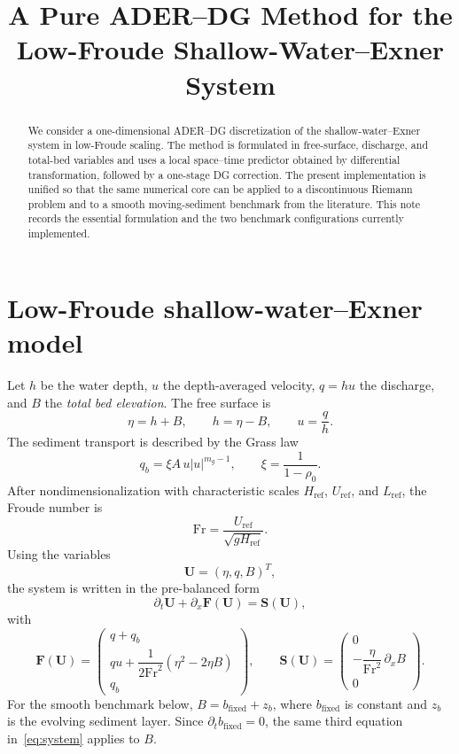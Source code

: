 \documentclass[11pt]{article}
\title{A Pure ADER--DG Method for the Low-Froude Shallow-Water--Exner System}
\author{}
\date{}
\newcommand{\Fr}{\mathrm{Fr}}
\begin{document}
\maketitle

\begin{abstract}
We consider a one-dimensional ADER--DG discretization of the shallow-water--Exner system in low-Froude scaling. The method is formulated in free-surface, discharge, and total-bed variables and uses a local space--time predictor obtained by differential transformation, followed by a one-stage DG correction. The present implementation is unified so that the same numerical core can be applied to a discontinuous Riemann problem and to a smooth moving-sediment benchmark from the literature. This note records the essential formulation and the two benchmark configurations currently implemented.
\end{abstract}

\section{Low-Froude shallow-water--Exner model}

Let $h$ be the water depth, $u$ the depth-averaged velocity, $q=hu$ the discharge, and $B$ the \emph{total bed elevation}. The free surface is
\[
    \eta=h+B,
    \qquad h=\eta-B,
    \qquad u=\frac{q}{h}.
\]
The sediment transport is described by the Grass law
\begin{equation}
    q_b=\xi A\,u|u|^{m_g-1},
    \qquad
    \xi=\frac{1}{1-\rho_0}.
    \label{eq:grass}
\end{equation}
After nondimensionalization with characteristic scales $H_{\mathrm{ref}}$, $U_{\mathrm{ref}}$, and $L_{\mathrm{ref}}$, the Froude number is
\[
    \Fr=\frac{U_{\mathrm{ref}}}{\sqrt{gH_{\mathrm{ref}}}}.
\]
Using the variables
\[
    \bm U=(\eta,q,B)^T,
\]
the system is written in the pre-balanced form
\begin{equation}
    \partial_t\bm U+\partial_x\bm F(\bm U)=\bm S(\bm U),
    \label{eq:system}
\end{equation}
with
\begin{equation}
    \bm F(\bm U)=
    \begin{pmatrix}
        q+q_b\\[1mm]
        qu+\dfrac{1}{2\Fr^2}\left(\eta^2-2\eta B\right)\\[1mm]
        q_b
    \end{pmatrix},
    \qquad
    \bm S(\bm U)=
    \begin{pmatrix}
        0\\[1mm]
        -\dfrac{\eta}{\Fr^2}\,\partial_x B\\[1mm]
        0
    \end{pmatrix}.
    \label{eq:flux-source}
\end{equation}
For the smooth benchmark below, $B=b_{\mathrm{fixed}}+z_b$, where $b_{\mathrm{fixed}}$ is constant and $z_b$ is the evolving sediment layer. Since $\partial_t b_{\mathrm{fixed}}=0$, the same third equation in~\eqref{eq:system} applies to $B$.
\end{document}
